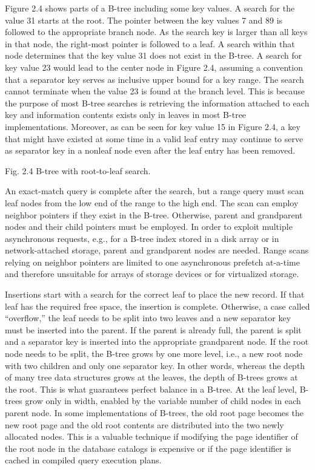 Figure 2.4 shows parts of a B-tree including some key values. A search
for the value 31 starts at the root. The pointer between the key values
7 and 89 is followed to the appropriate branch node. As the search key
is larger than all keys in that node, the right-most pointer is followed
to a leaf. A search within that node determines that the key value 31
does not exist in the B-tree. A search for key value 23 would lead to
the center node in Figure 2.4, assuming a convention that a separator
key serves as inclusive upper bound for a key range. The search cannot
terminate when the value 23 is found at the branch level. This is
because the purpose of most B-tree searches is retrieving the
information attached to each key and information contents exists only in
leaves in most B-tree implementations. Moreover, as can be seen for key
value 15 in Figure 2.4, a key that might have existed at some time in a
valid leaf entry may continue to serve as separator key in a nonleaf
node even after the leaf entry has been removed.

Fig. 2.4 B-tree with root-to-leaf search.

An exact-match query is complete after the search, but a range query
must scan leaf nodes from the low end of the range to the high end. The
scan can employ neighbor pointers if they exist in the B-tree.
Otherwise, parent and grandparent nodes and their child pointers must be
employed. In order to exploit multiple asynchronous requests, e.g., for
a B-tree index stored in a disk array or in network-attached storage,
parent and grandparent nodes are needed. Range scans relying on neighbor
pointers are limited to one asynchronous prefetch at-a-time and
therefore unsuitable for arrays of storage devices or for virtualized
storage.

Insertions start with a search for the correct leaf to place the new
record. If that leaf has the required free space, the insertion is
complete. Otherwise, a case called ``overflow,'' the leaf needs to be
split into two leaves and a new separator key must be inserted into the
parent. If the parent is already full, the parent is split and a
separator key is inserted into the appropriate grandparent node. If the
root node needs to be split, the B-tree grows by one more level, i.e., a
new root node with two children and only one separator key. In other
words, whereas the depth of many tree data structures grows at the
leaves, the depth of B-trees grows at the root. This is what guarantees
perfect balance in a B-tree. At the leaf level, B-trees grow only in
width, enabled by the variable number of child nodes in each parent
node. In some implementations of B-trees, the old root page becomes the
new root page and the old root contents are distributed into the two
newly allocated nodes. This is a valuable technique if modifying the
page identifier of the root node in the database catalogs is expensive
or if the page identifier is cached in compiled query execution plans.

